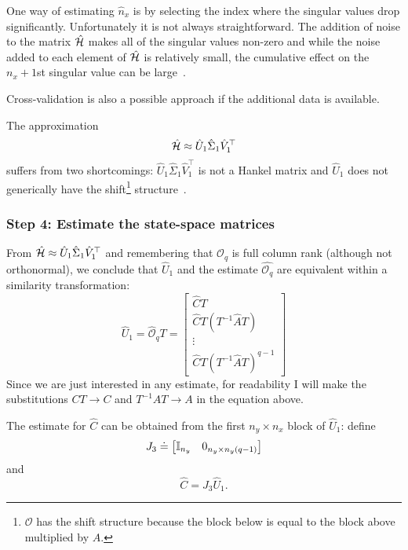 One way of estimating $\hat{n}_x$ is by selecting the index where the singular values drop significantly. Unfortunately it is not always straightforward. The addition of noise to the matrix $\hat{\mathcal{H}}$ makes all of the singular values non-zero and while the noise added to each element of $\hat{\mathcal{H}}$ is relatively small, the cumulative effect on the $n_x+1$st singular value can be large~\cite{smith-suppl13}.

Cross-validation is also a possible approach if the additional data is available.

The approximation
\begin{equation*}
  \hat{\mathcal{H}} \approx \hat{U}_1\hat{\Sigma}_1\hat{V}_1^\top
\end{equation*}
suffers from two shortcomings: $\hat{U}_1\hat{\Sigma}_1\hat{V}_1^\top$ is not a Hankel matrix and $\hat{U}_1$ does not generically have the shift\footnote{$\mathcal{O}$ has the shift structure because the block below is equal to the block above multiplied by $A$.} structure~\cite{smith-suppl13}.

\subsubsection{Step 4: Estimate the state-space matrices}

From $\hat{\mathcal{H}} \approx \hat{U}_1\hat{\Sigma}_1\hat{V}_1^\top$
and remembering that $\mathcal{O}_q$ is full column rank (although not orthonormal), we conclude that $\hat{U}_1$ and the estimate $\hat{\mathcal{O}_q}$ are equivalent within a similarity transformation:
\begin{equation*}
  \hat{U}_1 = \hat{\mathcal{O}}_qT =
  \begin{bmatrix}
    \hat{C}T \\ \hat{C}T\left(T^{-1}\hat{A}T\right) \\ \vdots \\ \hat{C}T\left(T^{-1}\hat{A}T\right)^{q-1}
  \end{bmatrix}
\end{equation*}
Since we are just interested in any estimate, for readability I will make the substitutions $CT\rightarrow C$ and $T^{-1}AT \rightarrow A$ in the equation above.

The estimate for $\hat{C}$ can be obtained from the first $n_y\times n_x$ block of $\hat{U}_1$: define
\begin{equation*}
  J_3 \doteq
  \begin{bmatrix}
    \mathbb{I}_{n_y} & 0_{n_y\times n_y(q-1)}
  \end{bmatrix}
\end{equation*}
and
\begin{equation*}
  \hat{C} = J_3\hat{U}_1.
\end{equation*}

